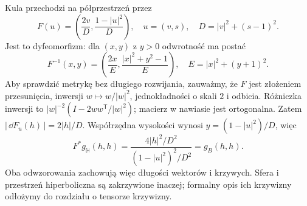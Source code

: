 \begin{przyklad}
Kula przechodzi na półprzestrzeń przez
\[
 F(u)=\left(\frac{2v}{D},\frac{1-|u|^2}{D}\right),
 \quad u=(v,s),\quad D=|v|^2+(s-1)^2.
\]
Jest to dyfeomorfizm: dla $(x,y)$ z $y>0$
odwrotność ma postać
\[
 F^{-1}(x,y)=
 \left(\frac{2x}{E},
       \frac{|x|^2+y^2-1}{E}\right),
 \quad E=|x|^2+(y+1)^2.
\]
Aby sprawdzić metrykę bez długiego rozwijania,
zauważmy, że $F$ jest złożeniem przesunięcia,
inwersji $w\mapsto w/|w|^2$, jednokładności
o skali $2$ i odbicia. Różniczka inwersji to
$|w|^{-2}(I-2ww^{\mathsf T}/|w|^2)$;
macierz w nawiasie jest ortogonalna.
Zatem $|\,\dd F_u(h)\,|=2|h|/D$.
Współrzędna wysokości wynosi
$y=(1-|u|^2)/D$, więc
\[
 F^*g_{\mathbb H}(h,h)
 =\frac{4|h|^2/D^2}{(1-|u|^2)^2/D^2}
 =g_B(h,h).
\]
Oba odwzorowania zachowują więc długości
wektorów i krzywych. Sfera i przestrzeń
hiperboliczna są zakrzywione inaczej;
formalny opis ich krzywizny odłożymy do
rozdziału o tensorze krzywizny.
\end{przyklad}

